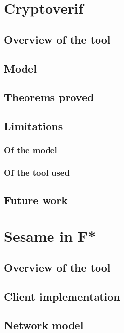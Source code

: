 \documentclass[a4paper, 10pt]{article}
\begin{document}
\section{Cryptoverif}
	\subsection{Overview of the tool}

	\subsection{Model}

	\subsection{Theorems proved}

	\subsection{Limitations}
		\subsubsection{Of the model}

		\subsubsection{Of the tool used}

	\subsection{Future work}

\section{Sesame in F*}
	\subsection{Overview of the tool}

	\subsection{Client implementation}

	\subsection{Network model}
\end{document}
